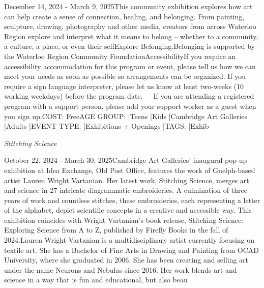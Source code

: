 \documentclass[letterpaper, 10pt]{article}
\newcommand{\subtitle}[1]{\textit{\large #1}\vspace{0.5em}}
\newcommand{\articlecontent}[1]{\small #1\vspace{1em}}
\begin{document}
\begin{multicols}{2}
{
\vspace{10px}

December 14, 2024 - March 9, 2025This community exhibition explores how art can help create a sense of connection, healing, and belonging. From painting, sculpture, drawing, photography and other media, creators from across Waterloo Region explore and interpret what it means to belong – whether to a community, a culture, a place, or even their selfExplore Belonging.Belonging is supported by the Waterloo Region Community FoundationAccessibilityIf you require an accessibility accommodation for this program or event, please tell us how we can meet your needs as soon as possible so arrangements can be organized. If you require a sign language interpreter, please let us know at least two-weeks (10 working weekdays) before the program date.   If you are attending a registered program with a support person, please add your support worker as a guest when you sign up.COST: FreeAGE GROUP: |Teens |Kids |Cambridge Art Galleries |Adults |EVENT TYPE: |Exhibitions + Openings |TAGS: |Exhib
}
\vspace{10px}

\subtitle{Stitching Science}

\articlecontent{

\qrcode[height=1.5cm]{https://ideaexchange.libnet.info/event/12110997}
\vspace{10px}

October 22, 2024 - March 30, 2025Cambridge Art Galleries' inaugural pop-up exhibition at Idea Exchange, Old Post Office, features the work of Guelph-based artist Lauren Wright Vartanian. Her latest work, Stitching Science, merges art and science in 27 intricate diagrammatic embroideries. A culmination of three years of work and countless stitches, these embroideries, each representing a letter of the alphabet, depict scientific concepts in a creative and accessible way. This exhibition coincides with Wright Vartanian’s book release, Stitching Science: Exploring Science from A to Z, published by Firefly Books in the fall of 2024.Lauren Wright Vartanian is a multidisciplinary artist currently focusing on textile art. She has a Bachelor of Fine Arts in Drawing and Painting from OCAD University, where she graduated in 2006. She has been creating and selling art under the name Neurons and Nebulas since 2016. Her work blends art and science in a way that is fun and educational, but also beau
}
\vspace{10px}


\end{multicols}
\end{document}
